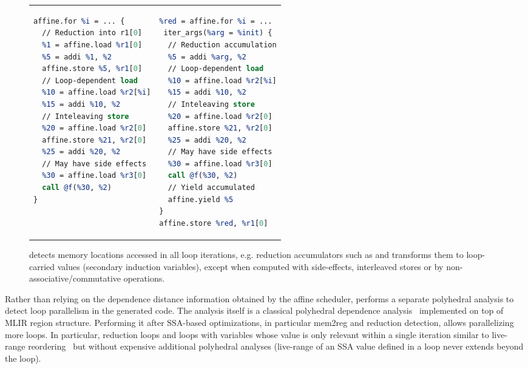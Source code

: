 \begin{figure}
\centering
\begin{tabular}{l@{$\Rightarrow$}l}
{\scriptsize
\begin{lstlisting}[language=llvm]
affine.for %i = ... {
  // Reduction into r1[0]
  %1 = affine.load %r1[0]
  %5 = addi %1, %2
  affine.store %5, %r1[0]
  // Loop-dependent load
  %10 = affine.load %r2[%i]
  %15 = addi %10, %2
  // Inteleaving store
  %20 = affine.load %r2[0]
  affine.store %21, %r2[0]
  %25 = addi %20, %2
  // May have side effects
  %30 = affine.load %r3[0]
  call @f(%30, %2)
}
\end{lstlisting}
}&{
\scriptsize
\begin{lstlisting}[language=llvm]
%init = affine.load %r1[0]
%red = affine.for %i = ...
 iter_args(%arg = %init) {
  // Reduction accumulation
  %5 = addi %arg, %2
  // Loop-dependent load
  %10 = affine.load %r2[%i]
  %15 = addi %10, %2
  // Inteleaving store
  %20 = affine.load %r2[0]
  affine.store %21, %r2[0]
  %25 = addi %20, %2
  // May have side effects
  %30 = affine.load %r3[0]
  call @f(%30, %2)
  // Yield accumulated 
  affine.yield %5
}
affine.store %red, %r1[0]
\end{lstlisting}
}
\end{tabular}
\caption{\tool detects memory locations accessed in all loop iterations, e.g. reduction accumulators such as  and transforms them to loop-carried values (secondary induction variables), except when computed with side-effects, interleaved stores or  by non-associative/commutative operations.}
\label{fig:red}
\end{figure}





\label{sec:parallelization}
Rather than relying on the dependence distance information obtained by the affine scheduler, \tool performs a separate polyhedral analysis to detect loop parallelism in the generated code. The analysis itself is a classical polyhedral dependence analysis~\cite{feautrier1991dataflow,eisenbeis1992general} implemented on top of MLIR region structure. Performing it after SSA-based optimizations, in particular mem2reg and reduction detection, allows parallelizing more loops. In particular, reduction loops and loops with variables whose value is only relevant within a single iteration similar to live-range reordering~\cite{verdoolaege2016live} but without expensive additional polyhedral analyses (live-range of an SSA value defined in a loop never extends beyond the loop).

